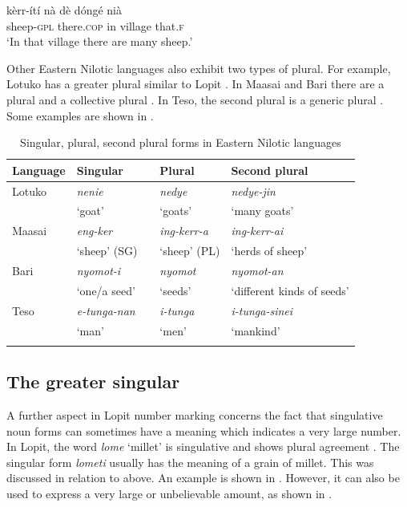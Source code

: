 \documentclass[output=paper]{langsci/langscibook}
\begin{document}
\ea\label{ex:moodie:7}
\gll k\`{e}rr-\'{i}t\'{i} n\`{a} d\`{e} d\'{o}ng\'{e} ni\`{a}\\
sheep-\textsc{gpl} there.\textsc{cop} in village that.\textsc{f} \\
\glt ‘In that village there are many sheep.’
\z

Other Eastern Nilotic languages also exhibit two types of plural. For example, Lotuko has a greater plural similar to Lopit \citep[57]{Muratori1938}. In Maasai and Bari there are a plural and a collective plural \citep[242]{Dimmendaal2000}. In Teso, the second plural is a generic plural \citep[4]{HildersLawrance1957}. Some examples are shown in . 

\begin{table}
\begin{tabularx}{\textwidth}{XXcXX}
\lsptoprule

 \textbf{Language} & \textbf{Singular} &  & \textbf{Plural} & \textbf{Second plural}\\ \midrule
Lotuko & \itshape nenie &  & \itshape nedye & \itshape nedye-jin\\
& ‘goat’ &  & ‘goats’ & ‘many goats’\\
Maasai & \itshape eng-ker &  & \itshape ing-kerr-a & \itshape ing-kerr-ai\\
& ‘sheep’ (SG) &  & ‘sheep’ (PL) & ‘herds of sheep’\\
Bari & \itshape nyomot-i &  & \itshape nyomot & \itshape nyomot-an\\
& ‘one/a seed’ &  & ‘seeds’ & ‘different kinds of seeds’\\
Teso & \itshape e-tunga-nan &  & \itshape i-tunga & \itshape i-tunga-sinei\\
& ‘man’ &  & ‘men’ & ‘mankind’\\
\lspbottomrule
\end{tabularx}
\caption{Singular, plural, second plural forms in Eastern Nilotic languages}
\label{tab:moodie:18}
\end{table}

\subsection{The greater singular}\label{sec:moodie:5.2}

A further aspect in Lopit number marking concerns the fact that singulative noun forms can sometimes have a meaning which indicates a very large number. In Lopit, the word \textit{lome} ‘millet’ is singulative and shows plural agreement . The singular form \textit{lometi} usually has the meaning of a grain of millet. This was discussed in relation to  above. An example is shown in . However, it can also be used to express a very large or unbelievable amount, as shown in .
\end{document}
